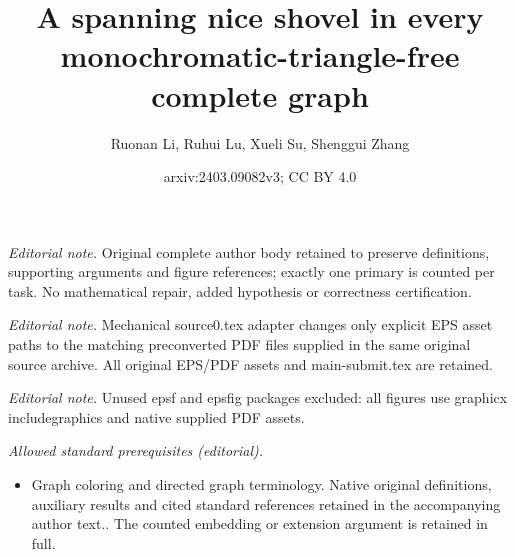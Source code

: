 \documentclass[10pt,a4paper]{article}
\title{A spanning nice shovel in every monochromatic-triangle-free complete graph}
\author{Ruonan Li, Ruhui Lu, Xueli Su, Shenggui Zhang}
\date{arxiv:2403.09082v3; CC BY 4.0}
\theoremstyle{definition}
\begin{document}
\maketitle
\noindent\textit{Editorial note.} Original complete author body retained to preserve definitions, supporting arguments and figure references; exactly one primary is counted per task. No mathematical repair, added hypothesis or correctness certification.\par\medskip
\noindent\textit{Editorial note.} Mechanical source0.tex adapter changes only explicit EPS asset paths to the matching preconverted PDF files supplied in the same original source archive. All original EPS/PDF assets and main-submit.tex are retained.\par\medskip
\noindent\textit{Editorial note.} Unused epsf and epsfig packages excluded: all figures use graphicx includegraphics and native supplied PDF assets.\par\medskip
\noindent\textit{Allowed standard prerequisites (editorial).}\begin{itemize}
\item Graph coloring and directed graph terminology. Native original definitions, auxiliary results and cited standard references retained in the accompanying author text.. The counted embedding or extension argument is retained in full.
\end{itemize}\medskip
\end{document}
